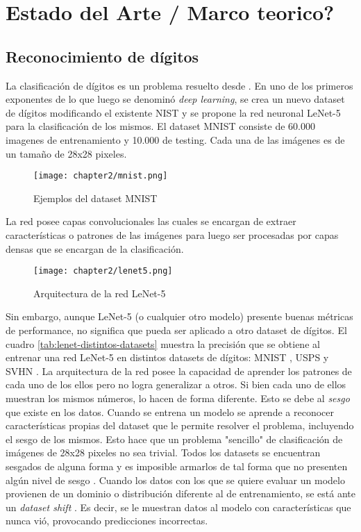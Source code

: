 \chapter{Estado del Arte / Marco teorico?}

\label{Chapter2}

\section{Reconocimiento de d\'igitos}

La clasificaci\'on de d\'igitos es un problema resuelto desde \citeyear{lecun1998gradient}. En uno de los primeros
exponentes de lo que luego se denomin\'o {\it deep learning}, \cite{lecun1998gradient} se crea un nuevo dataset de
d\'igitos modificando el existente NIST y se propone la red neuronal LeNet-5 para la clasificaci\'on de los mismos. El
dataset MNIST consiste de 60.000 imagenes de entrenamiento y 10.000 de testing. Cada una de las im\'agenes es de un
tama\~{n}o de 28x28 pixeles.

\begin{figure}[H]
    \centering
    \texttt{[image: chapter2/mnist.png]}
    \caption{Ejemplos del dataset MNIST}
    \label{fig:mnist}
\end{figure}

La red posee capas convolucionales las cuales se encargan de extraer caracter\'isticas o patrones de las im\'agenes
para luego ser procesadas por capas densas que se encargan de la clasificaci\'on.

\begin{figure}[H]
    \centering
    \texttt{[image: chapter2/lenet5.png]}
    \caption{Arquitectura de la red LeNet-5}
    \label{fig:lenet-5}
\end{figure}

Sin embargo, aunque LeNet-5 (o cualquier otro modelo) presente buenas m\'etricas de performance, no significa que pueda
ser aplicado a otro dataset de d\'igitos. El cuadro \ref{tab:lenet-distintos-datasets} muestra la precisi\'on que se
obtiene al entrenar una red LeNet-5 en distintos datasets de d\'igitos: MNIST \parencite{lecun1998gradient}, USPS \parencite{hull1994database} y SVHN \parencite{netzer2011reading}. La arquitectura de la red posee la capacidad de aprender los patrones de cada uno de los
ellos pero no logra generalizar a otros. Si bien cada uno de ellos muestran los mismos n\'umeros, lo hacen de forma
diferente. Esto se debe al {\it sesgo} que existe en los datos. Cuando se entrena un modelo se aprende a reconocer
caracter\'isticas propias del dataset que le permite resolver el problema, incluyendo el sesgo de los mismos. Esto hace
que un problema "sencillo" de clasificaci\'on de im\'agenes de 28x28 pixeles no sea trivial. Todos los datasets se
encuentran sesgados de alguna forma y es imposible armarlos de tal forma que no presenten alg\'un nivel de sesgo \parencite{khosla2012undoing}. Cuando los datos con los que se quiere evaluar un modelo provienen de un dominio o
distribuci\'on diferente al de entrenamiento, se est\'a ante un {\it dataset shift} \parencite{quinonero2008dataset}. Es decir, se le muestran datos al modelo con caracter\'isticas que nunca vi\'o,
provocando predicciones incorrectas.

